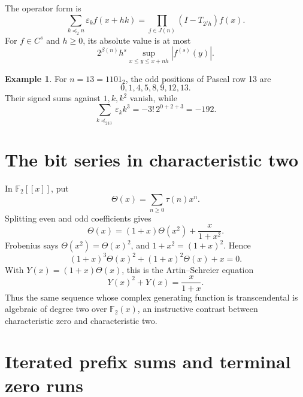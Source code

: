 \documentclass[11pt,oneside]{article}
\numberwithin{equation}{section}
\theoremstyle{definition}
\newtheorem{example}[theorem]{Example}
\theoremstyle{remark}
\newcommand{\F}{\mathbb F}
\newcommand{\eps}{\varepsilon}
\newcommand{\TM}{\tau}
\newcommand{\submask}{\preceq_2}
\begin{document}
The operator form is
\begin{equation}
 \boxed{\sum_{k\submask n}\eps_kf(x+hk)
 =\prod_{j\in J(n)}(I-T_{2^jh})f(x).}
 \label{eq:sparse-operator}
\end{equation}
For \(f\in C^s\) and \(h\ge0\), its absolute value is at most
\begin{equation}
 2^{\beta(n)}h^s\sup_{x\le y\le x+nh}|f^{(s)}(y)|.
 \label{eq:sparse-bound}
\end{equation}

\begin{example}
For \(n=13=1101_2\), the odd positions of Pascal row 13 are
\[
 0,1,4,5,8,9,12,13.
\]
Their signed sums against \(1,k,k^2\) vanish, while
\[
 \sum_{k\submask13}\eps_kk^3=-3!\,2^{0+2+3}=-192.
\]
\end{example}

\section{The bit series in characteristic two}
\label{sec:F2}

In \(\F_2[[x]]\), put
\begin{equation}
 \Theta(x)=\sum_{n\ge0}\TM(n)x^n.
 \label{eq:Theta-F2}
\end{equation}
Splitting even and odd coefficients gives
\begin{equation}
 \Theta(x)=(1+x)\Theta(x^2)+\frac{x}{1+x^2}.
 \label{eq:F2-functional}
\end{equation}
Frobenius says \(\Theta(x^2)=\Theta(x)^2\), and
\(1+x^2=(1+x)^2\).  Hence
\begin{equation}
 \boxed{(1+x)^3\Theta(x)^2+(1+x)^2\Theta(x)+x=0.}
 \label{eq:F2-quadratic}
\end{equation}
With \(Y(x)=(1+x)\Theta(x)\), this is the Artin--Schreier equation
\begin{equation}
 \boxed{Y(x)^2+Y(x)=\frac{x}{1+x}.}
 \label{eq:Artin-Schreier}
\end{equation}
Thus the same sequence whose complex generating function is transcendental is
algebraic of degree two over \(\F_2(x)\), an instructive contrast between
characteristic zero and characteristic two.

\section{Iterated prefix sums and terminal zero runs}
\label{sec:iterated-prefix}
\end{document}
